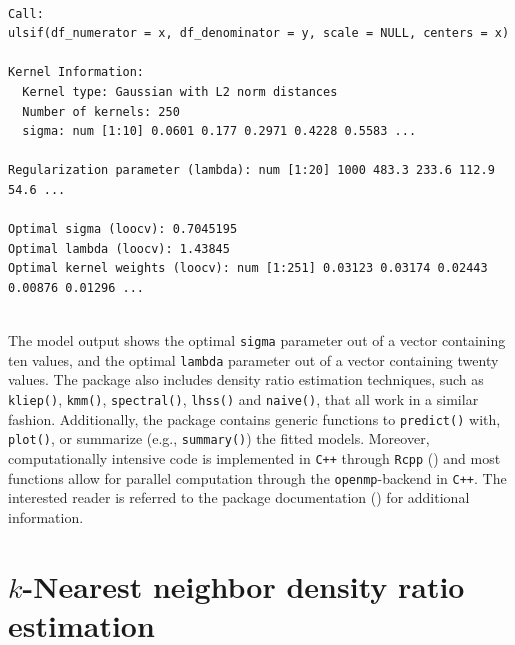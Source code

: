 \documentclass[
]{article}
\begin{document}
\begin{verbatim}

Call:
ulsif(df_numerator = x, df_denominator = y, scale = NULL, centers = x)

Kernel Information:
  Kernel type: Gaussian with L2 norm distances
  Number of kernels: 250
  sigma: num [1:10] 0.0601 0.177 0.2971 0.4228 0.5583 ...

Regularization parameter (lambda): num [1:20] 1000 483.3 233.6 112.9 54.6 ...

Optimal sigma (loocv): 0.7045195
Optimal lambda (loocv): 1.43845
Optimal kernel weights (loocv): num [1:251] 0.03123 0.03174 0.02443 0.00876 0.01296 ...
 
\end{verbatim}

\linespread{2}

The model output shows the optimal \texttt{sigma} parameter out of a
vector containing ten values, and the optimal \texttt{lambda} parameter
out of a vector containing twenty values. The package also includes
density ratio estimation techniques, such as \texttt{kliep()},
\texttt{kmm()}, \texttt{spectral()}, \texttt{lhss()} and
\texttt{naive()}, that all work in a similar fashion. Additionally, the
package contains generic functions to \texttt{predict()} with,
\texttt{plot()}, or summarize (e.g., \texttt{summary()}) the fitted
models. Moreover, computationally intensive code is implemented in
\texttt{C++} through \texttt{Rcpp} () and most functions allow for parallel computation through the
\texttt{openmp}-backend in \texttt{C++}. The interested reader is
referred to the package documentation
() for additional information.

\section{\texorpdfstring{\(k\)-Nearest neighbor density ratio
estimation}{k-Nearest neighbor density ratio estimation}}\label{sec-app-B}
\end{document}
